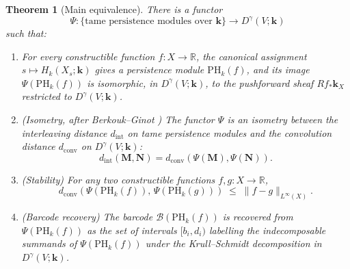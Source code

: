 \documentclass[12pt,a4paper]{amsart}
\newtheorem{theorem}{Theorem}[section]
\theoremstyle{definition}
\newcommand{\R}{\mathbb{R}}
\newcommand{\kk}{\mathbf{k}}                %
\newcommand{\PHk}{\mathrm{PH}_k}            %
\newcommand{\dconv}{d_{\mathrm{conv}}}      %
\newcommand{\Dgamma}{D^\gamma}              %
\begin{document}
\begin{theorem}[Main equivalence]
  \label{thm:main}
  There is a functor
  \[
    \Psi: \bigl\{\text{tame persistence modules over } \kk \bigr\}
    \longrightarrow \Dgamma(V;\kk)
  \]
  such that:
  \begin{enumerate}
    \item[\textup{(E1)}]
      For every constructible function $f: X \to \R$, the canonical
      assignment $s \mapsto H_k(X_s;\kk)$ gives a persistence module
      $\PHk(f)$, and its image $\Psi(\PHk(f))$ is isomorphic, in
      $\Dgamma(V;\kk)$, to the pushforward sheaf
      $Rf_*\kk_X$ restricted to $\Dgamma(V;\kk)$.

    \item[\textup{(E2)}] \textup{(Isometry, after Berkouk--Ginot \cite{BG2018})}
      The functor $\Psi$ is an isometry between the
      \emph{interleaving distance} $d_\mathrm{int}$ on tame persistence
      modules and the convolution distance $\dconv$ on $\Dgamma(V;\kk)$:
      \[
        d_\mathrm{int}(\mathbf{M}, \mathbf{N})
        = \dconv(\Psi(\mathbf{M}), \Psi(\mathbf{N})).
      \]

    \item[\textup{(E3)}] \textup{(Stability)}
      For any two constructible functions $f, g: X \to \R$,
      \[
        \dconv(\Psi(\PHk(f)),\, \Psi(\PHk(g)))
        \;\leq\; \|f - g\|_{L^\infty(X)}.
      \]

    \item[\textup{(E4)}] \textup{(Barcode recovery)}
      The barcode $\mathcal{B}(\PHk(f))$ is recovered from
      $\Psi(\PHk(f))$ as the set of intervals $[b_i, d_i)$ labelling
      the indecomposable summands of $\Psi(\PHk(f))$ under the
      Krull--Schmidt decomposition in $\Dgamma(V;\kk)$.
  \end{enumerate}
\end{theorem}
\end{document}
